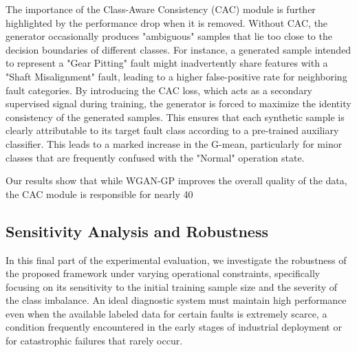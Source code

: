 The importance of the Class-Aware Consistency (CAC) module is further highlighted by the performance drop when it is removed. Without CAC, the generator occasionally produces "ambiguous" samples that lie too close to the decision boundaries of different classes. For instance, a generated sample intended to represent a "Gear Pitting" fault might inadvertently share features with a "Shaft Misalignment" fault, leading to a higher false-positive rate for neighboring fault categories. By introducing the CAC loss, which acts as a secondary supervised signal during training, the generator is forced to maximize the identity consistency of the generated samples. This ensures that each synthetic sample is clearly attributable to its target fault class according to a pre-trained auxiliary classifier. This leads to a marked increase in the G-mean, particularly for minor classes that are frequently confused with the "Normal" operation state.

Our results show that while WGAN-GP improves the overall quality of the data, the CAC module is responsible for nearly 40%

\subsection{Sensitivity Analysis and Robustness}
\label{subsec:sensitivity}

In this final part of the experimental evaluation, we investigate the robustness of the proposed framework under varying operational constraints, specifically focusing on its sensitivity to the initial training sample size and the severity of the class imbalance. An ideal diagnostic system must maintain high performance even when the available labeled data for certain faults is extremely scarce, a condition frequently encountered in the early stages of industrial deployment or for catastrophic failures that rarely occur.

